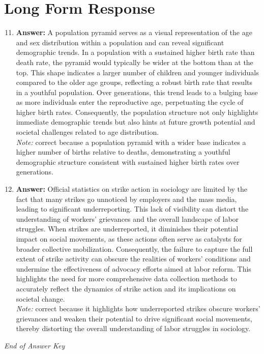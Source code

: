 \documentclass[12pt]{article}
\begin{document}
\section*{Long Form Response}
\begin{enumerate}[label=\arabic*.]
\setcounter{enumi}{10}
\item \textbf{Answer:} A population pyramid serves as a visual representation of the age and sex distribution within a population and can reveal significant demographic trends. In a population with a sustained higher birth rate than death rate, the pyramid would typically be wider at the bottom than at the top. This shape indicates a larger number of children and younger individuals compared to the older age groups, reflecting a robust birth rate that results in a youthful population. Over generations, this trend leads to a bulging base as more individuals enter the reproductive age, perpetuating the cycle of higher birth rates. Consequently, the population structure not only highlights immediate demographic trends but also hints at future growth potential and societal challenges related to age distribution.
\\ \textit{Note:} correct because a population pyramid with a wider base indicates a higher number of births relative to deaths, demonstrating a youthful demographic structure consistent with sustained higher birth rates over generations.
\item \textbf{Answer:} Official statistics on strike action in sociology are limited by the fact that many strikes go unnoticed by employers and the mass media, leading to significant underreporting. This lack of visibility can distort the understanding of workers' grievances and the overall landscape of labor struggles. When strikes are underreported, it diminishes their potential impact on social movements, as these actions often serve as catalysts for broader collective mobilization. Consequently, the failure to capture the full extent of strike activity can obscure the realities of workers' conditions and undermine the effectiveness of advocacy efforts aimed at labor reform. This highlights the need for more comprehensive data collection methods to accurately reflect the dynamics of strike action and its implications on societal change.
\\ \textit{Note:} correct because it highlights how underreported strikes obscure workers' grievances and weaken their potential to drive significant social movements, thereby distorting the overall understanding of labor struggles in sociology.
\end{enumerate}

\vfill
\noindent\textit{End of Answer Key}
\end{document}
